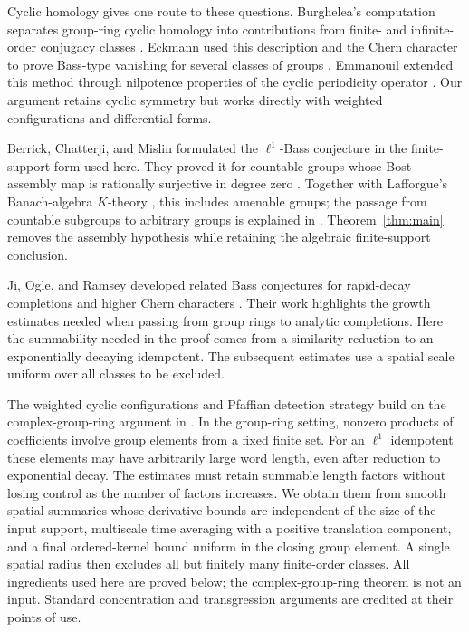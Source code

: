 Cyclic homology gives one route to these questions. Burghelea's
computation separates group-ring cyclic homology into contributions
from finite- and infinite-order conjugacy classes
\cite{Burghelea1985}. Eckmann used this description and the Chern
character to prove Bass-type vanishing for several classes of groups
\cite{Eckmann1986}. Emmanouil extended this method through nilpotence
properties of the cyclic periodicity operator \cite{Emmanouil1998}.
Our argument retains cyclic symmetry but works directly with weighted
configurations and differential forms.

Berrick, Chatterji, and Mislin formulated the $\ell^1$-Bass conjecture
in the finite-support form used here. They proved it for countable
groups whose Bost assembly map is rationally surjective in degree zero
\cite[Theorem~1.4]{BCM2004}. Together with Lafforgue's Banach-algebra
$K$-theory \cite{Lafforgue2002}, this includes amenable groups;
the passage from countable subgroups to arbitrary groups is explained
in \cite[Lemma~1.5]{BCM2004}. Theorem~\ref{thm:main} removes the
assembly hypothesis while retaining the algebraic finite-support
conclusion.

Ji, Ogle, and Ramsey developed related Bass conjectures for
rapid-decay completions and higher Chern characters
\cite{JOR2010,JOR2014}. Their work highlights the growth estimates
needed when passing from group rings to analytic completions.
Here the summability needed in the proof comes from a similarity
reduction to an exponentially decaying idempotent. The subsequent
estimates use a spatial scale uniform over all classes to be excluded.

The weighted cyclic configurations and Pfaffian detection strategy
build on the complex-group-ring argument in
\cite[Sections~7--8]{OpenAIBass2026}. In the group-ring setting,
nonzero products of coefficients involve group elements from a fixed
finite set. For an $\ell^1$ idempotent these elements may have
arbitrarily large word length, even after reduction to exponential
decay. The estimates must retain summable length factors without
losing control as the number of factors increases. We obtain them
from smooth spatial summaries whose derivative bounds are independent
of the size of the input support, multiscale time averaging with a
positive translation component, and a final ordered-kernel bound
uniform in the closing group element. A single spatial radius then
excludes all but finitely many finite-order classes. All ingredients
used here are proved below; the complex-group-ring theorem is not an
input. Standard concentration and transgression arguments are
credited at their points of use.

